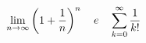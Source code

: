 \documentclass[preview]{standalone}
\begin{document}
\begin{align*}
\special{dvisvgm:raw <g id='unique000'>}\displaystyle\lim_{n\to\infty}\left(1+\frac{1}{n}\right)^n \quad e \quad \displaystyle\sum_{k=0}^{\infty}\frac{1}{k!}\special{dvisvgm:raw </g>}
\end{align*}
\end{document}
